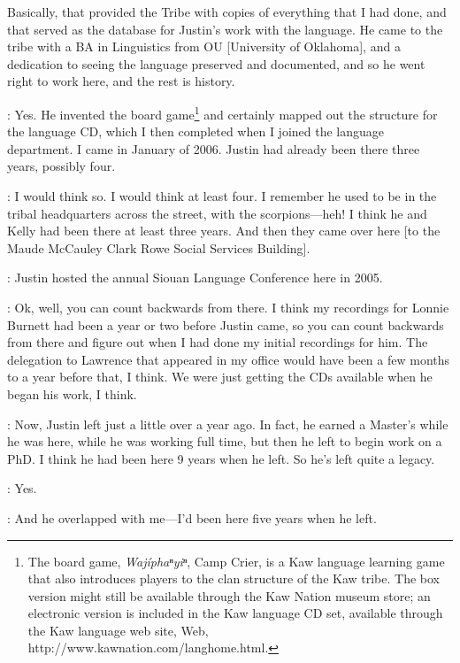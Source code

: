 \documentclass[output=paper]{LSP/langsci}
\begin{document}
Basically, that provided the Tribe with copies of everything that I had done, and that served as the database for Justin's work with the language. He came to the tribe with a BA in Linguistics from OU [University of Oklahoma], and a dedication to seeing the language preserved and documented, and so he went right to work here, and the rest is history.

: Yes. He invented the board game\footnote{The board game, \textit{Waj\'iphaⁿyiⁿ}, Camp Crier, is a Kaw language learning game that also introduces players to the clan structure of the Kaw tribe. The box version might still be available through the Kaw Nation museum store; an electronic version is included in the Kaw language CD set, available through the Kaw language web site, Web, {http://www.kawnation.com/langhome.html}.} and certainly mapped out the structure for the language CD, which I then completed when I joined the language department. I came in January of 2006. Justin had already been there three years, possibly four.

: I would think so. I would think at least four. I remember he used to be in the tribal headquarters across the street, with the scorpions---heh! I think he and Kelly had been there at least three years. And then they came over here [to the Maude McCauley Clark Rowe Social Services Building].

: Justin hosted the annual Siouan Language Conference here in 2005. 

: Ok, well, you can count backwards from there. I think my recordings for Lonnie Burnett had been a year or two before Justin came, so you can count backwards from there and figure out when I had done my initial recordings for him. The delegation to Lawrence that appeared in my office would have been a few months to a year before that, I think. We were just getting the CDs available when he began his work, I think.

: Now, Justin left just a little over a year ago. In fact, he earned a Master's while he was here, while he was working full time, but then he left to begin work on a PhD. I think he had been here 9 years when he left. So he's left quite a legacy.

: Yes.

: And he overlapped with me---I'd been here five years when he left.
\end{document}
